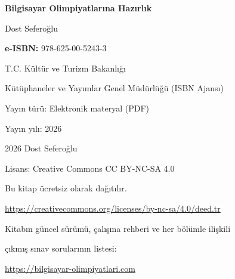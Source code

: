 \thispagestyle{empty}

\null
\vfill

{\small
\noindent\textbf{Bilgisayar Olimpiyatlarına Hazırlık}\par
\vspace{0.2em}
\noindent Dost Seferoğlu\par
\vspace{1.4em}
\noindent\textbf{e-ISBN:} 978-625-00-5243-3\par
\vspace{0.35em}
\noindent T.C. Kültür ve Turizm Bakanlığı\par
\noindent Kütüphaneler ve Yayımlar Genel Müdürlüğü (ISBN Ajansı)\par
\vspace{1.4em}
\noindent Yayın türü: Elektronik materyal (PDF)\par
\noindent Yayın yılı: 2026\par
\vspace{1.4em}
\noindent\textcopyright{} 2026 Dost Seferoğlu\par
\noindent Lisans: Creative Commons CC BY-NC-SA 4.0\par
\noindent Bu kitap ücretsiz olarak dağıtılır.\par
\noindent\url{https://creativecommons.org/licenses/by-nc-sa/4.0/deed.tr}\par
\vspace{1.4em}
\noindent Kitabın güncel sürümü, çalışma rehberi ve her bölümle ilişkili\par
\noindent çıkmış sınav sorularının listesi:\par
\noindent\url{https://bilgisayar-olimpiyatlari.com}\par
}

\clearpage
